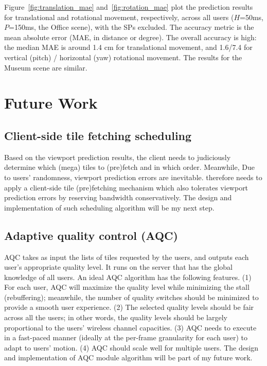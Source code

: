 Figure~\ref{fig:translation_mae} and~\ref{fig:rotation_mae} plot the prediction results
for translational and rotational movement, respectively, across all users ($H$=50ms, $P$=150ms, the Office scene), with the SPs excluded.
%
The accuracy metric is the mean absolute error (MAE, in distance or degree). %
The overall accuracy is high: the median MAE is around 1.4 cm for translational movement, and 1.6\degree{}/7.4\degree{} for vertical (pitch) / horizontal (yaw) rotational movement. The results for the Museum scene are similar.


\section{Future Work}
\subsection{Client-side tile fetching scheduling}
\label{sec:prefetch}
Based on the viewport prediction results, the client needs to judiciously determine which (mega) tiles
to (pre)fetch and in which order. Meanwhile, Due to users’ randomness,
viewport prediction errors are inevitable. \firefly therefore needs to apply a client-side tile (pre)fetching mechanism which also tolerates viewport prediction errors by reserving bandwidth conservatively. The design and implementation of such scheduling algorithm will be my next step.

\subsection{Adaptive quality control (AQC)}
\label{sec:aqc}
AQC takes as input the lists of tiles requested by the users,
and outputs each user’s appropriate quality level. It runs on
the server that has the global knowledge of all users. An ideal
AQC algorithm has the following features. (1) For each user,
AQC will maximize the quality level while minimizing the
stall (rebuffering); meanwhile, the number of quality switches
should be minimized to provide a smooth user experience.
(2) The selected quality levels should be fair across all the
users; in other words, the quality levels should be largely
proportional to the users’ wireless channel capacities. (3)
AQC needs to execute in a fast-paced manner (ideally at the
per-frame granularity for each user) to adapt to users’ motion.
(4) AQC should scale well for multiple users. The design and implementation of \firefly AQC module algorithm will be part of my future work.
 
